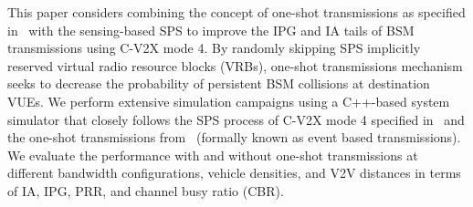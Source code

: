 \documentclass[conference]{IEEEtran}
\begin{document}

This paper considers combining the concept of one-shot transmissions as specified in~\cite{J3161} with the sensing-based SPS to improve the IPG and IA tails of BSM transmissions using C-V2X mode 4. By randomly skipping SPS implicitly reserved virtual radio resource blocks (VRBs), one-shot transmissions mechanism seeks to decrease the probability of persistent BSM collisions at destination VUEs. We perform extensive simulation campaigns using a C++-based system simulator that closely follows the SPS process of C-V2X mode 4 specified in~\cite{3gpp36213} and the one-shot transmissions from~\cite{J3161} (formally known as event based transmissions). We evaluate the performance with and without one-shot transmissions at different bandwidth configurations, vehicle densities, and V2V distances in terms of IA, IPG, PRR, and channel busy ratio (CBR).
\end{document}
